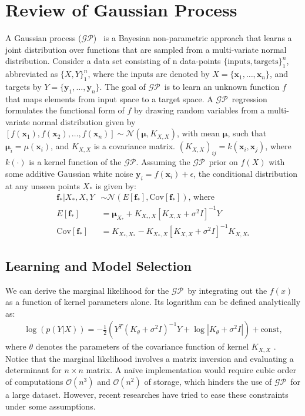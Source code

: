 \documentclass{article} \usepackage{iclr2021_conference,times}
\newcommand{\GP}{$\mathcal{GP}$}
\begin{document}
\section{Review of Gaussian Process} 
\label{sec:review}
A Gaussian process (\GP)~\citep{Rasmussen06gaussianprocesses} is a Bayesian non-parametric approach that learns a joint distribution over functions that are sampled from a multi-variate normal distribution. Consider a data set consisting of n data-points $\{ \text{inputs},\text{targets}\}_1^n$, abbreviated as $\{X,Y\}_1^n$, where the inputs are denoted by $X = \{ \mathbf{x}_1,\dots,\mathbf{x}_n\}$, and targets by $Y = \{\mathbf{y}_1,\dots,\mathbf{y}_n\}$.
The goal of \GP\ is to learn an unknown function $f$ that maps elements from input space to a target space. A \GP\ regression formulates the functional form of $f$ by drawing random variables from a multi-variate normal distribution given by $\left[f(\mathbf{x}_1),f(\mathbf{x}_2),\dots,f(\mathbf{x}_n)\right]\sim \mathcal{N}(\mathbf{\mu},K_{X, X})$,
with mean $\mathbf{\mu}$, such that $\mathbf{\mu}_i = \mu(\mathbf{x}_i)$, and $K_{X,X}$ is a covariance matrix. $(K_{X,X})_{ij} = k(\mathbf{x}_i,\mathbf{x}_j)$, where $k(\cdot)$ is a kernel function of the \GP. Assuming the \GP\ prior on $f(X)$ with some additive Gaussian white noise $\mathbf{y}_i = f(\mathbf{x}_i) +\epsilon$, the conditional distribution at any unseen points $X_*$ is given by:
\begin{align}
\mathbf{f}_*|X_*,X,Y &\sim \mathcal{N}(E[\mathbf{f_*}],\text{Cov}[\mathbf{f_*}] ) \label{conditional_distribution}\text{, where} \\
E[\mathbf{f_*}] &= \mathbf{\mu}_{X_*} + K_{X_*,X}[K_{X,X} +\sigma^2I]^{-1}Y \nonumber \\
\text{Cov}[\mathbf{f_*}] &= K_{X_*,X_*} - K_{X_*,X}[K_{X,X} +\sigma^2I]^{-1}K_{X,X_*}\nonumber 
\end{align}
\vspace{-0.05in}
\subsection{Learning and Model Selection}
\vspace{-0.05in}
We can derive the marginal likelihood for the \GP\ by integrating out the $f(x)$ as a function of kernel parameters alone. Its logarithm can be defined analytically as:
\begin{align}
\log \left(p\left(Y|X\right)\right) = -\frac{1}{2}\left(Y^T\left(K_\theta+ \sigma^2I\right)^{-1}Y +\log \left|K_\theta+ \sigma^2I\right|\right)+ \text{const}, 
\label{marglikelihood}
\end{align}
where $\theta$ denotes the parameters of the covariance function of kernel $K_{X,X}$ .  
Notice that the marginal likelihood involves a matrix inversion and evaluating a determinant for $n\times n$ matrix. A na\"ive implementation would require cubic order of computations $\mathcal{O}(n^3)$ and $\mathcal{O}(n^2)$ of storage, which hinders the use of \GP\ for a large dataset. However, recent researches have tried to ease these constraints under some assumptions.  
\end{document}
